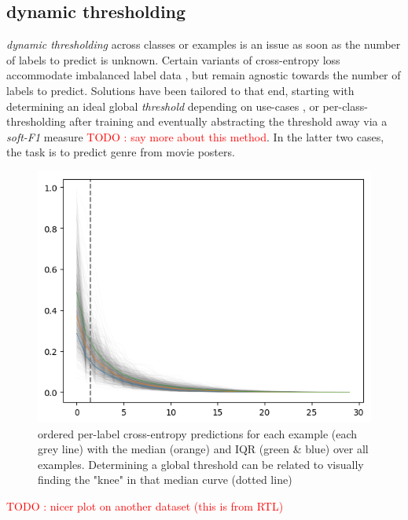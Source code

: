 \documentclass[sigconf,natbib,screen=true,review=true,anonymous]{acmart}
\newcommand\todo[1]{\textcolor{red}{TODO : #1}}
\begin{document}

\subsection{dynamic thresholding}
\label{sec:orgd700854}

\emph{dynamic thresholding} across classes or examples is an issue as soon as the number of labels to predict is unknown. Certain variants of cross-entropy loss accommodate imbalanced label data  \cite{focalLoss}, but remain agnostic towards the number of labels to predict. Solutions have been tailored to that end, starting with determining an ideal global \emph{threshold} depending on use-cases \cite{threshForF1}, or per-class-thresholding after training \cite{moviePosters} and eventually abstracting the threshold away via a \emph{soft-F1} measure \cite{softF1} \todo{say more about this method}. In the latter two cases, the task is to predict genre from movie posters.

\begin{figure}[htbp]
\centering
\includegraphics[width=.9\linewidth]{./images/knee.png}
\caption{\label{fig:knee}
ordered per-label cross-entropy predictions for each example (each grey line) with the median (orange) and IQR (green \& blue) over all examples. Determining a global threshold can be related to visually finding the "knee" in that median curve (dotted line)}
\end{figure}

\todo{nicer plot on another dataset (this is from RTL)}
\end{document}
